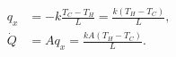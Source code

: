 \begin{equation}
\begin{aligned}
q_x&=-k\frac{T_C-T_H}{L}=\frac{k(T_H-T_C)}{L},\\
\dot Q&=Aq_x=\frac{kA(T_H-T_C)}{L}.
\end{aligned}
\label{eq:7-3}
\end{equation}